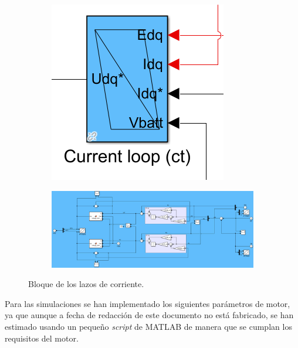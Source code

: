 \begin{figure}[H]
    \begin{subfigure}{0.2\linewidth}
        \centering
        \includegraphics[width=\linewidth]{fig/PIEMR_out.png}
    \end{subfigure}
    \begin{subfigure}{0.75\linewidth}
        \centering
        \includegraphics[width=\linewidth]{fig/PIEMR_in.png}
    \end{subfigure}
    \caption{Bloque de los lazos de corriente.}
\end{figure}

Para las simulaciones se han implementado los siguientes parámetros de motor, ya que aunque a fecha de redacción de este documento no está fabricado, se han estimado usando un pequeño \textit{script} de MATLAB de manera que se cumplan los requisitos del motor.


